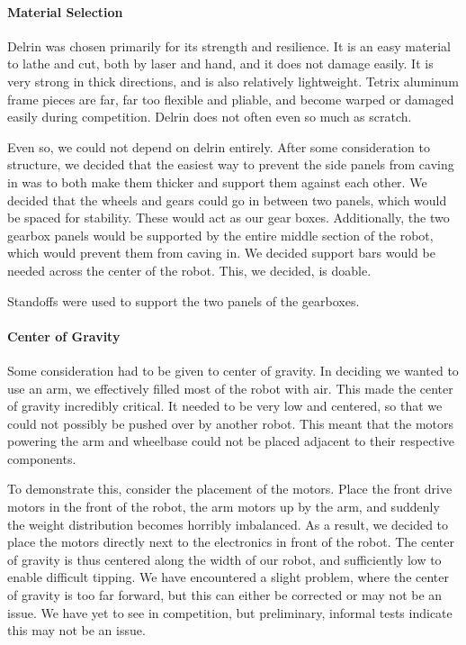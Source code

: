 \paragraph{Material Selection} Delrin was chosen primarily for its strength and resilience. It is an easy material to lathe and cut, both by laser and hand, and it does not damage easily. It is very strong in thick directions, and is also relatively lightweight. Tetrix aluminum frame pieces are far, far too flexible and pliable, and become warped or damaged easily during competition. Delrin does not often even so much as scratch.

Even so, we could not depend on delrin entirely. After some consideration to structure, we decided that the easiest way to prevent the side panels from caving in was to both make them thicker and support them against each other. We decided that the wheels and gears could go in between two panels, which would be spaced for stability. These would act as our gear boxes. Additionally, the two gearbox panels would be supported by the entire middle section of the robot, which would prevent them from caving in. We decided support bars would be needed across the center of the robot. This, we decided, is doable.

Standoffs were used to support the two panels of the gearboxes.

\paragraph{Center of Gravity} Some consideration had to be given to center of gravity. In deciding we wanted to use an arm, we effectively filled most of the robot with air. This made the center of gravity incredibly critical. It needed to be very low and centered, so that we could not possibly be pushed over by another robot. This meant that the motors powering the arm and wheelbase could not be placed adjacent to their respective components. 

To demonstrate this, consider the placement of the motors. Place the front drive motors in the front of the robot, the arm motors up by the arm, and suddenly the weight distribution becomes horribly imbalanced. As a result, we decided to place the motors directly next to the electronics in front of the robot. The center of gravity is thus centered along the width of our robot, and sufficiently low to enable difficult tipping. We have encountered a slight problem, where the center of gravity is too far forward, but this can either be corrected or may not be an issue. We have yet to see in competition, but preliminary, informal tests indicate this may not be an issue. 

